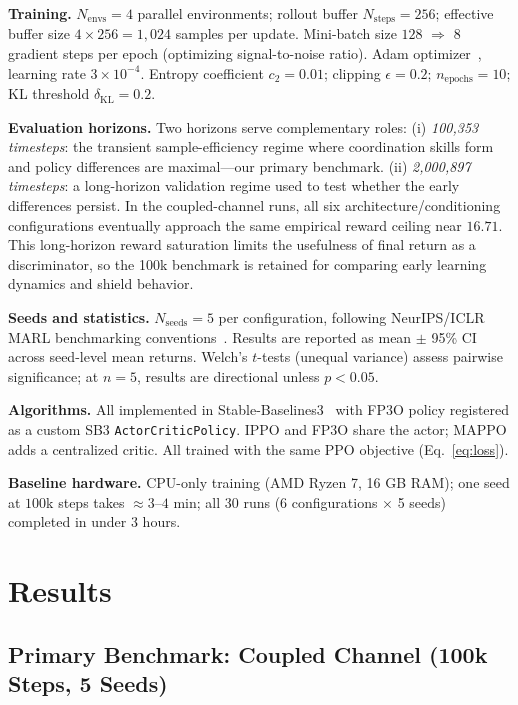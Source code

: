 \documentclass[conference]{IEEEtran}
\begin{document}
\textbf{Training.}
$N_{\text{envs}}=4$ parallel environments; rollout buffer $N_{\text{steps}}=256$;
effective buffer size $4\times256=1{,}024$ samples per update. Mini-batch size
$128$ $\Rightarrow$ $8$ gradient steps per epoch (optimizing signal-to-noise
ratio). Adam optimizer~\cite{kingma2015adam}, learning rate $3\times10^{-4}$.
Entropy coefficient $c_2=0.01$; clipping $\epsilon=0.2$; $n_{\text{epochs}}=10$;
KL threshold $\delta_{\text{KL}}=0.2$.

\textbf{Evaluation horizons.}
Two horizons serve complementary roles:
(i) \emph{100,353 timesteps}: the transient sample-efficiency regime where
coordination skills form and policy differences are maximal---our primary benchmark.
(ii) \emph{2,000,897 timesteps}: a long-horizon validation regime used to test whether
the early differences persist. In the coupled-channel runs, all six architecture/conditioning
configurations eventually approach the same empirical reward ceiling near $16.71$.
This long-horizon reward saturation limits the usefulness of final return as a discriminator,
so the 100k benchmark is retained for comparing early learning dynamics and shield behavior.

\textbf{Seeds and statistics.}
$N_{\text{seeds}}=5$ per configuration, following NeurIPS/ICLR MARL benchmarking
conventions~\cite{b3}. Results are reported as mean $\pm$ 95\% CI across seed-level
mean returns. Welch's $t$-tests (unequal variance) assess pairwise significance;
at $n=5$, results are directional unless $p<0.05$.

\textbf{Algorithms.}
All implemented in Stable-Baselines3~\cite{b20} with FP3O policy registered as a
custom SB3 \texttt{ActorCriticPolicy}. IPPO and FP3O share the actor; MAPPO adds a
centralized critic. All trained with the same PPO objective (Eq.~\ref{eq:loss}).

\textbf{Baseline hardware.}
CPU-only training (AMD Ryzen 7, 16 GB RAM); one seed at $100$k steps takes
${\approx}3$--$4$ min; all 30 runs (6 configurations $\times$ 5 seeds) completed
in under $3$ hours.


\section{Results}

\subsection{Primary Benchmark: Coupled Channel (100k Steps, 5 Seeds)}
\end{document}
